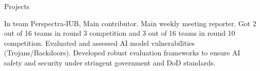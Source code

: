 \begin{rubric}{Projects}

\entry*[2020.5 -- 2024.5]%
In team Perspectra-IUB, Main contributor. Main weekly meeting reporter. Got 2 out of 16 teams in round 3 competition and 3 out of 16 teams in round 10 competition. Evaluated and assessed AI model vulnerabilities (Trojans/Backdoors). Developed robust evaluation frameworks to ensure AI safety and security under stringent government and DoD standards.


\end{rubric}